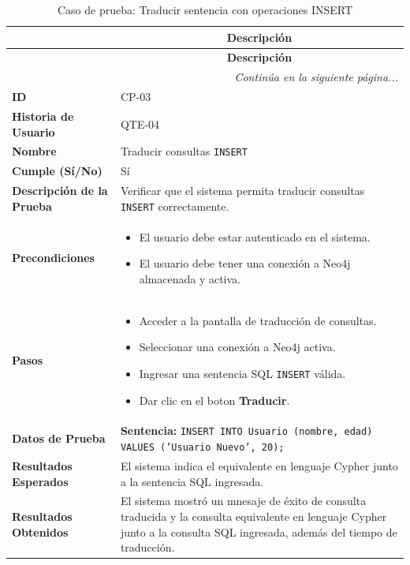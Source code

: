 \begin{longtable}[c]{|m{}|m{}|}
    \caption{Caso de prueba: Traducir sentencia con operaciones INSERT}
    \label{tab:casoPrueba03} \\
    
     \hline
    \rowcolor{gray!50}
    \multicolumn{1}{|c|}{\textbf{Campo}} & \multicolumn{1}{c|}{\textbf{Descripción}} \\
    \hline
    \endfirsthead

    \hline
    \rowcolor{gray!50}
    \multicolumn{1}{|c|}{\textbf{Campo}} & \multicolumn{1}{c|}{\textbf{Descripción}} \\
    \hline
    \endhead

    \multicolumn{2}{r}{\textit{Continúa en la siguiente página...}} \\
    \endfoot
    
    \endlastfoot

    \textbf{ID} & CP-03 \\
    \hline
    \textbf{Historia de Usuario} & QTE-04 \\
    \hline
    \textbf{Nombre} & Traducir consultas \texttt{INSERT} \\
    \hline
    \textbf{Cumple (Sí/No)} & Sí \\
    \hline
    \textbf{Descripción de la Prueba} & Verificar que el sistema permita traducir consultas \texttt{INSERT} correctamente. \\
    \hline
    \textbf{Precondiciones} & \begin{itemize}
        \item El usuario debe estar autenticado en el sistema.
        \item El usuario debe tener una conexión a Neo4j almacenada y activa.
    \end{itemize} \\
    \hline
    \textbf{Pasos} & \begin{itemize}
        \item Acceder a la pantalla de traducción de consultas.
        \item Seleccionar una conexión a Neo4j activa.
        \item Ingresar una sentencia SQL \texttt{INSERT} válida.
        \item Dar clic en el boton \textbf{Traducir}.
    \end{itemize} \\
    \hline
    \textbf{Datos de Prueba} & \textbf{Sentencia:} \texttt{INSERT INTO Usuario (nombre, edad) VALUES ('Usuario Nuevo', 20);} \\
    \hline
    \textbf{Resultados Esperados} & El sistema indica el equivalente en lenguaje Cypher junto a la sentencia SQL ingresada. \\
    \hline
    \textbf{Resultados Obtenidos} & El sistema mostró un mnesaje de éxito de consulta traducida y la consulta equivalente en lenguaje Cypher junto a la consulta SQL ingresada, además del tiempo de traducción. \\
    \hline
\end{longtable}